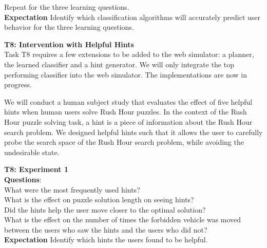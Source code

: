 \documentclass[doctor]{thesis} %
\theoremstyle{plain}
\begin{document}
Repeat for the three learning questions.
\\
\textbf{Expectation} Identify which classification algorithms will accurately predict user behavior for the three learning questions.

\textbf{T8: Intervention with Helpful Hints}\\
Task T8 requires a few extensions to be added to the web simulator: a planner, the learned classifier and a hint generator. We will only integrate the top performing classifier into the web simulator. The implementations are now in progress.

We will conduct a human subject study that evaluates the effect of five helpful hints when human users solve Rush Hour puzzles. In the context of the Rush Hour puzzle solving task, a hint is a piece of information about the Rush Hour search problem. We designed helpful hints such that it allows the user to carefully probe the search space of the Rush Hour search problem, while avoiding the undesirable state.

\textbf{T8: Experiment 1}\\
\textbf{Questions}: \\
What were the most frequently used hints?\\
What is the effect on puzzle solution length on seeing hints?
\\
Did the hints help the user move closer to the optimal solution?\\
What is the effect on the number of times the forbidden vehicle was moved between the users who saw the hints and the users who did not?\\
\textbf{Expectation} Identify which hints the users found to be helpful.
\end{document}
